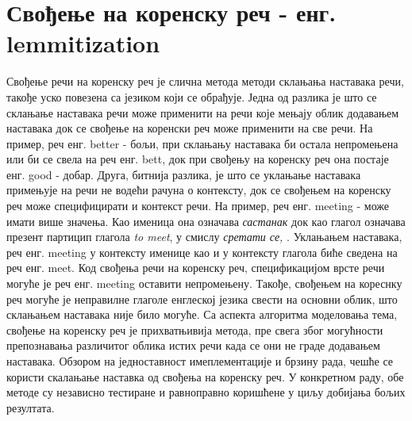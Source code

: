 	
	\section{Свођење на коренску реч - енг. lemmitization}

Свођење речи на коренску реч је слична метода методи склањања наставака речи, такође уско повезена са језиком који се обрађује. Једна од  разлика је што се склањање наставака речи може применити на речи које мењају облик додавањем наставака док се свођење на коренски реч може применити на све речи. На пример,  реч енг. better - бољи, при склањању наставака би остала непромењена  или би се свела на реч енг. bett,  док при свођењу на коренску реч она постаје енг. good - добар.
Друга, битнија разлика, је што се уклањање наставака  примењује на речи не водећи рачуна о контексту, док се свођењем на коренску реч може специфицирати и контекст речи. На пример, реч енг. meeting - може имати више значења. Као именица она означава \textit{састанак} док као глагол означава презент партицип глагола \textit{to meet}, у смислу \textit{сретати се, }. Уклањањем наставака, реч енг. meeting  у контексту именице као и у контексту глагола биће сведена на реч енг. meet. Код свођења речи на коренску реч, спецификацијом врсте речи могуће је реч енг. meeting оставити непромењену.
Такође, свођењем на кореснку реч могуће је неправилне глаголе енглеској језика свести на основни облик, што склањањем наставака није било могуће. 
Са аспекта алгоритма моделовања тема, свођење на коренску реч је прихватњивија метода, пре свега због могућности препознавања различитог облика истих речи када се они не граде додавањем наставака.
Обзором на једноставност имеплементације и брзину рада, чешће се користи скалањање наставка од свођења на коренску реч. У конкретном раду, обе методе су независно тестиране и равноправно коришћене у циљу добијања бољих резултата.
	
